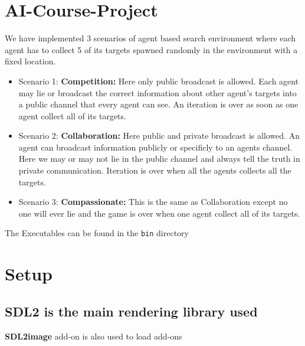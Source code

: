 \documentclass[a4paper,12pt]{article}
\author{Justin Kaipada}
\date{\today}
\title{}
\let\OldTexttt\texttt
\renewcommand{\texttt}[1]{\OldTexttt{\footnotesize\colorbox{background}{\textcolor{foreground}{#1}}}}
\begin{document}
\section{AI-Course-Project}
\label{sec:orgb31c682}

We have implemented 3 scenarios of agent based search environment where each agent has to collect 5
of its targets spawned randomly in the environment with a fixed location.

\begin{itemize}
\item Scenario 1: \textbf{Competition:} Here only public broadcast is allowed. Each agent may lie or
broadcast the correct information about other agent's targets into a public channel that every
agent can see. An iteration is over as soon as one agent collect all of its targets.
\item Scenario 2: \textbf{Collaboration:} Here public and private broadcast is allowed. An agent can
broadcast information publicly or specificly to an agents channel. Here we may or may not lie in
the public channel and always tell the truth in private communication. Iteration is over when all
the agents collects all the targets.
\item Scenario 3: \textbf{Compassionate:} This is the same as Collaboration except no one will ever lie and
the game is over when one agent collect all of its targets.
\end{itemize}

The Executables can be found in the \texttt{bin} directory

\section{Setup}
\label{sec:org078fa71}
\subsection{SDL2 is the main rendering library used}
\label{sec:org99d68cc}

\textbf{SDL2image} add-on is also used to load add-ons
\end{document}
